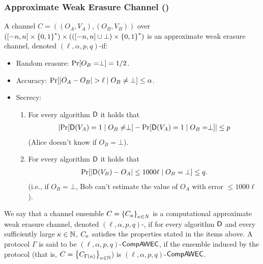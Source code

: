 \subsubsection{Approximate Weak Erasure Channel (\AWEC)}\label{sec:AWEC}

\begin{definition}[\AWEC]\label{def:AWEC}
	A channel $C = ((O_A,V_A), (O_B,V_B))$ over $([-n,n] \times \zo^*) \times (([-n,n] \cup \bot)  \times \zo^*)$ is an {\sf approximate weak erasure channel}, denoted $(\ell,\alpha,p,q)$-\AWEC if:
	\begin{itemize}
		
		\item Random erasure: $\pr{O_B = \perp} = 1/2$.
		
		\item Accuracy: $\pr{\size{O_A - O_B} > \ell \mid O_B \ne \bot}\le \alpha$.
		
		\item Secrecy:
		
		\begin{enumerate}
			\item For every algorithm $\mathsf{D}$ it holds that\label{AWEC:item:A}
			\begin{align*}
				\size{\pr{\Dc(V_A) = 1 \mid O_B \neq \perp} - \pr{\Dc(V_A) = 1 \mid O_B = \perp}} \le p
			\end{align*}
			(Alice doesn't know if $O_B=\bot$).
			
			\item For every algorithm $\mathsf{D}$ it holds that\label{AWEC:item:B}
			\begin{align*}
				\pr{\size{\Dc(V_B) - O_A} \leq 1000 \ell \mid O_B=\bot} \leq q.
			\end{align*}
			(i.e., if $O_B=\bot$, Bob can't estimate the value of $O_A$ with error $\leq 1000 \ell$).
		\end{enumerate}
	\end{itemize}
     We say that a channel ensemble $C=\set{C_\pk}_{\pk\in N}$ is a {\sf computational approximate weak erasure channel}, denoted $(\ell,\alpha,p,q)$-\CompAWEC, if for every \ppt algorithm $\mathsf{D}$ and every sufficiently large $\kappa\in{\mathbb{N}}$, $C_\kappa$ satisfies the properties stated in the items above. A protocol $\Gamma$ is said to be $(\ell,\alpha,p,q)$-${\sf CompAWEC}$, if the ensemble induced by the protocol (that is, $C=\set{C_{\Gamma(\pk)}}_{\pk\in\N}$) is $(\ell,\alpha,p,q)$-${\sf CompAWEC}$.  
\end{definition}

